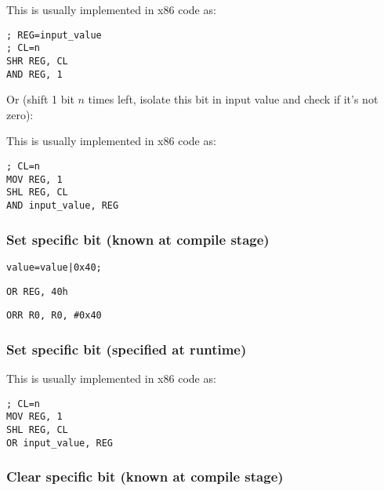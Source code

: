 This is usually implemented in x86 code as:

\begin{lstlisting}[caption=x86]
; REG=input_value
; CL=n
SHR REG, CL
AND REG, 1
\end{lstlisting}

Or (shift 1 bit $n$ times left, isolate this bit in input value and check if it's not zero):



This is usually implemented in x86 code as:

\begin{lstlisting}[caption=x86]
; CL=n
MOV REG, 1
SHL REG, CL
AND input_value, REG
\end{lstlisting}

\subsubsection{Set specific bit (known at compile stage)}

\begin{lstlisting}[caption=\CCpp]
value=value|0x40;
\end{lstlisting}

\begin{lstlisting}[caption=x86]
OR REG, 40h
\end{lstlisting}

\begin{lstlisting}[caption=ARM (\ARMMode) and ARM64]
ORR R0, R0, #0x40
\end{lstlisting}

\subsubsection{Set specific bit (specified at runtime)}



This is usually implemented in x86 code as:

\begin{lstlisting}[caption=x86]
; CL=n
MOV REG, 1
SHL REG, CL
OR input_value, REG
\end{lstlisting}

\subsubsection{Clear specific bit (known at compile stage)}

